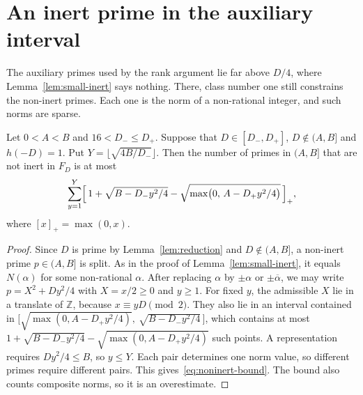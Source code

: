 \section{An inert prime in the auxiliary interval}\label{supp:prime}
The auxiliary primes used by the rank argument lie far above $D/4$, where
Lemma~\ref{lem:small-inert} says nothing. There, class number one still
constrains the non-inert primes. Each one is the norm of a non-rational
integer, and such norms are sparse.

\begin{lemma}\label{lem:noninert-count}
Let $0<A<B$ and $16<D_-\le D_+$. Suppose that $D\in[D_-,D_+]$, $D\notin(A,B]$
and $h(-D)=1$. Put $Y=\lfloor\sqrt{4B/D_-}\rfloor$. Then the number of primes in
$(A,B]$ that are not inert in $F_D$ is at most
\begin{equation}\label{eq:noninert-bound}
  \sum_{y=1}^{Y}\Bigl[\,1+\sqrt{B-D_-y^2/4}
  -\sqrt{\max\bigl(0,\,A-D_+y^2/4\bigr)}\,\Bigr]_+ ,
\end{equation}
where $[x]_+=\max(0,x)$.
\end{lemma}

\begin{proof}
Since $D$ is prime by Lemma~\ref{lem:reduction} and $D\notin(A,B]$, a non-inert
prime $p\in(A,B]$ is split. As in the proof of Lemma~\ref{lem:small-inert}, it
equals $N(\alpha)$ for some non-rational $\alpha$. After replacing $\alpha$ by
$\pm\alpha$ or $\pm\overline\alpha$, we may write
$p=X^2+Dy^2/4$ with $X=x/2\ge0$ and $y\ge1$. For fixed $y$, the admissible $X$
lie in a translate of $\mathbb{Z}$, because $x\equiv yD\pmod2$. They also lie in
an interval contained in
$\bigl[\sqrt{\max(0,A-D_+y^2/4)},\ \sqrt{B-D_-y^2/4}\,\bigr]$, which contains at
most $1+\sqrt{B-D_-y^2/4}-\sqrt{\max(0,A-D_+y^2/4)}$ such points. A
representation requires $Dy^2/4\le B$, so $y\le Y$. Each pair determines one norm value, so different primes require different
pairs. This gives~\eqref{eq:noninert-bound}. The bound
also counts composite norms, so it is an overestimate.
\end{proof}
